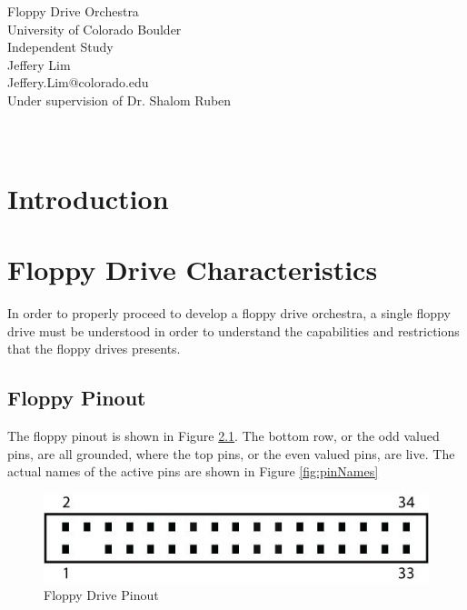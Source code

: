 \documentclass[11pt, a4paper]{report}
\begin{document}
\begin{center}
  \Huge Floppy Drive Orchestra \\
  \huge University of Colorado Boulder \\
  \Large Independent Study\\
  
  \vspace{6in}
    \huge Jeffery Lim \\
    \huge Jeffery.Lim@colorado.edu\\
    \Large Under supervision of Dr. Shalom Ruben \\~\\~\\
\end{center}
\pagebreak

\tableofcontents

\chapter{Introduction}
\chapter{Floppy Drive Characteristics}

In order to properly proceed to develop a floppy drive orchestra, a single floppy drive must be understood in order to understand the capabilities and restrictions that the floppy drives presents. 


\section{Floppy Pinout}

The floppy pinout is shown in Figure \ref{fig:pinOut}. The bottom row, or the odd valued pins, are all grounded, where the top pins, or the even valued pins, are live. The actual names of the active pins are shown in Figure \ref{fig:pinNames}
\begin{figure}[H]
\hspace*{-2cm}    
    \centering
    \includegraphics[width=.75\textwidth]{floppy_pinout.jpg}
    \caption{Floppy Drive Pinout}
    \label{fig:pinOut}
\end{figure}
\end{document}
